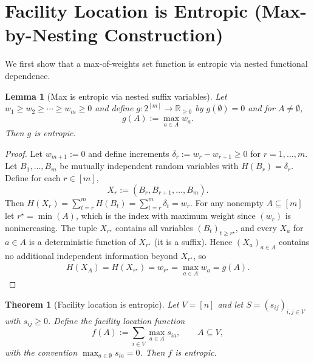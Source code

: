 \documentclass[conference]{IEEEtran}
\newtheorem{theorem}{Theorem}
\newtheorem{lemma}{Lemma}
\theoremstyle{definition}
\theoremstyle{remark}
\begin{document}
\section{Facility Location is Entropic (Max-by-Nesting Construction)} \label{sec:fac_loc}

We first show that a max-of-weights set function is entropic via nested functional dependence.

\begin{lemma}[Max is entropic via nested suffix variables]
\label{lem:max_entropic}
Let $w_1\ge w_2\ge \cdots \ge w_m\ge 0$ and define $g:2^{[m]}\to\mathbb{R}_{\ge 0}$ by
$g(\emptyset)=0$ and for $A\neq \emptyset$,
\[
g(A):=\max_{a\in A} w_a.
\]
Then $g$ is entropic.
\end{lemma}

\begin{proof}
Let $w_{m+1}:=0$ and define increments $\delta_r := w_r-w_{r+1}\ge 0$ for $r=1,\dots,m$.
Let $B_1,\dots,B_m$ be mutually independent random variables with $H(B_r)=\delta_r$.
Define for each $r\in[m]$,
\[
X_r := (B_r,B_{r+1},\dots,B_m).
\]
Then $H(X_r)=\sum_{t=r}^m H(B_t)=\sum_{t=r}^m \delta_t = w_r$.
For any nonempty $A\subseteq[m]$ let $r^\star=\min(A)$, which is the index with maximum weight since
$(w_r)$ is nonincreasing. The tuple $X_{r^\star}$ contains all variables $(B_t)_{t\ge r^\star}$,
and every $X_a$ for $a\in A$ is a deterministic function of $X_{r^\star}$ (it is a suffix).
Hence $(X_a)_{a\in A}$ contains no additional independent information beyond $X_{r^\star}$, so
\begin{align}
H(X_A) =H(X_{r^\star}) =w_{r^\star} =\max_{a\in A} w_a =g(A).
\end{align}
\end{proof}

\begin{theorem}[Facility location is entropic]
\label{thm:facility_location_entropic}
Let $V=[n]$ and let $S=(s_{ij})_{i,j\in V}$ with $s_{ij}\ge 0$. Define the facility location function
\[
f(A):=\sum_{i\in V} \max_{a\in A} s_{ia},\qquad A\subseteq V,
\]
with the convention $\max_{a\in \emptyset} s_{ia}=0$. Then $f$ is entropic.
\end{theorem}
\end{document}
